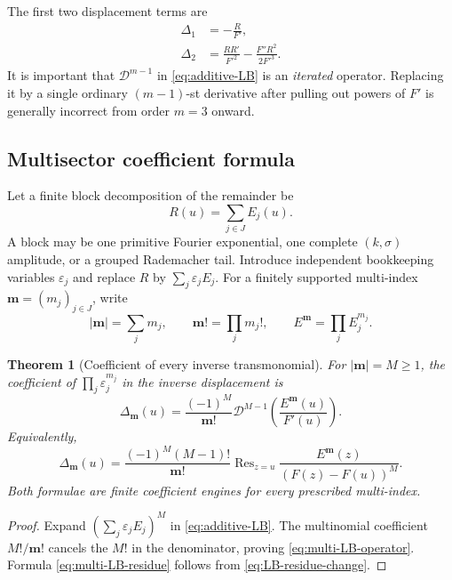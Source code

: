 \documentclass[11pt]{article}
\numberwithin{equation}{section}
\theoremstyle{mainthm}
\newtheorem{theorem}{Theorem}[section]
\theoremstyle{defstyle}
\theoremstyle{remark}
\newcommand{\Res}{\operatorname{Res}}
\newcommand{\Dop}{\mathscr D}
\begin{document}
The first two displacement terms are
\begin{align}
 \Delta_1&=-\frac{R}{F'},\label{eq:Delta1-general}\\
 \Delta_2&=\frac{RR'}{F'^2}-\frac{F''R^2}{2F'^3}.
 \label{eq:Delta2-general}
\end{align}
It is important that \(\Dop^{m-1}\) in \eqref{eq:additive-LB} is an \emph{iterated} operator.  Replacing it by a single ordinary \((m-1)\)-st derivative after pulling out powers of \(F'\) is generally incorrect from order \(m=3\) onward.

\subsection{Multisector coefficient formula}

Let a finite block decomposition of the remainder be
\begin{equation}\label{eq:R-block-decomposition}
 R(u)=\sum_{j\in J}E_j(u).
\end{equation}
A block may be one primitive Fourier exponential, one complete \((k,\sigma)\) amplitude, or a grouped Rademacher tail.  Introduce independent bookkeeping variables \(\varepsilon_j\) and replace \(R\) by \(\sum_j\varepsilon_jE_j\).  For a finitely supported multi-index \(\bm m=(m_j)_{j\in J}\), write
\[
 |\bm m|=\sum_jm_j,
 \qquad
 \bm m!=\prod_jm_j!,
 \qquad
 E^{\bm m}=\prod_jE_j^{m_j}.
\]

\begin{theorem}[Coefficient of every inverse transmonomial]\label{thm:multi-LB}
For \(|\bm m|=M\ge1\), the coefficient of \(\prod_j\varepsilon_j^{m_j}\) in the inverse displacement is
\begin{equation}\label{eq:multi-LB-operator}
 \boxed{
 \Delta_{\bm m}(u)=
 \frac{(-1)^M}{\bm m!}
 \Dop^{M-1}\!\left(\frac{E^{\bm m}(u)}{F'(u)}\right).}
\end{equation}
Equivalently,
\begin{equation}\label{eq:multi-LB-residue}
 \boxed{
 \Delta_{\bm m}(u)=
 \frac{(-1)^M(M-1)!}{\bm m!}
 \Res_{z=u}
 \frac{E^{\bm m}(z)}{(F(z)-F(u))^M}.}
\end{equation}
Both formulae are finite coefficient engines for every prescribed multi-index.
\end{theorem}

\begin{proof}
Expand \((\sum_j\varepsilon_jE_j)^M\) in \eqref{eq:additive-LB}.  The multinomial coefficient \(M!/\bm m!\) cancels the \(M!\) in the denominator, proving \eqref{eq:multi-LB-operator}.  Formula \eqref{eq:multi-LB-residue} follows from \eqref{eq:LB-residue-change}.
\end{proof}
\end{document}
